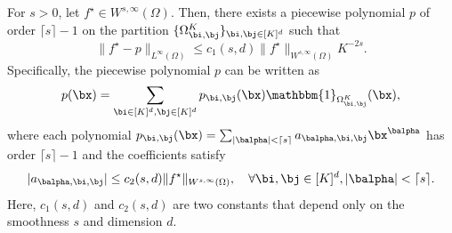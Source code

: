 \documentclass[11pt]{article}
\begin{document}
\begin{lemma}
    For $s>0$, let $f^{\star} \in W^{s, \infty}(\Omega)$. Then, there exists a piecewise polynomial $p$ of order $\lceil s \rceil -1$ on the partition $\{\Omega^{K}_{\bi,\bj}\}_{\bi,\bj \in [K]^d}$ such that
    \begin{equation*}
        \|f^{\star} - p\|_{L^\infty(\Omega)} \leq c_1(s,d) \|f^{\star}\|_{W^{s,\infty}(\Omega)} K^{-2s}.
    \end{equation*}
    Specifically, the piecewise polynomial $p$ can be written as
    \begin{equation*}
        p(\bx) = \sum_{\bi \in [K]^d, \bj\in[K]^d} p_{\bi, \bj}(\bx) \mathbbm{1}_{\Omega_{\bi,\bj}^K}(\bx),
    \end{equation*}
    where each polynomial $p_{\bi,\bj}(\bx) = \sum_{|\balpha| < \lceil s \rceil} a_{\balpha,\bi,\bj} \bx^{\balpha}
    $ has order $\lceil s \rceil -1$ and the coefficients satisfy
    \begin{equation*}
        |a_{\balpha,\bi,\bj}| \leq c_2(s,d) \|f^{\star}\|_{W^{s,\infty}(\Omega)}, \quad \forall \bi,\bj \in [K]^d, |\balpha| < \lceil s \rceil.
    \end{equation*}
    Here, $c_1(s,d)$ and $c_2(s,d)$ are two constants that depend only on the smoothness $s$ and dimension $d$. 
    \label{lem:piece_poly_app}
\end{lemma}
\end{document}
